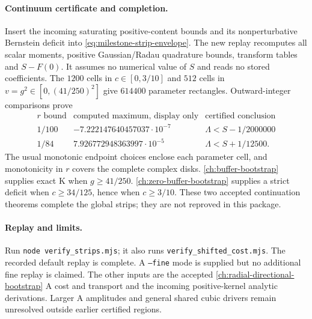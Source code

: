 \paragraph{Continuum certificate and completion.}
Insert the incoming saturating positive-content bounds and its
nonperturbative Bernstein deficit into
\eqref{eq:milestone-strip-envelope}.
The new replay recomputes all scalar moments, positive Gaussian/Radau
quadrature bounds, transform tables and \(S-F(0)\).
It assumes no numerical value of \(S\) and reads no stored coefficients.
The \(1200\) cells in \(c\in[0,3/10]\) and \(512\) cells in
\(v=g^2\in[0,(41/250)^2]\) give \(614400\) parameter rectangles.
Outward-integer comparisons prove
\[
\begin{array}{c|c|c}
r\text{ bound}&\text{computed maximum, display only}&
\text{certified conclusion}\\\hline
1/100&-7.222147640457037\cdot10^{-7}&\Lambda<S-1/2000000\\
1/84& 7.926772948363997\cdot10^{-5}&\Lambda<S+1/12500.
\end{array}
\]
The usual monotonic endpoint choices enclose each parameter cell,
and monotonicity in \(r\) covers the complete complex disks.
\autoref{ch:buffer-bootstrap} supplies exact K when \(g\ge41/250\).
\autoref{ch:zero-buffer-bootstrap} supplies a strict deficit when \(c\ge34/125\), hence when
\(c\ge3/10\). These two accepted continuation theorems complete the
global strips; they are not reproved in this package.

\paragraph{Replay and limits.}
Run \texttt{node verify\_strips.mjs}; it also runs
\texttt{verify\_shifted\_cost.mjs}. The recorded default replay is
complete. A \texttt{--fine} mode is supplied but no additional fine
replay is claimed. The other inputs are the accepted \autoref{ch:radial-directional-bootstrap} A
cost and transport and the incoming positive-kernel analytic
derivations. Larger A amplitudes and general shared cubic drivers
remain unresolved outside earlier certified regions.
